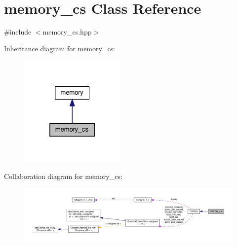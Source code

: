 \hypertarget{classmemory__cs}{}\section{memory\+\_\+cs Class Reference}
\label{classmemory__cs}


{\ttfamily \#include $<$memory\+\_\+cs.\+hpp$>$}



Inheritance diagram for memory\+\_\+cs\+:
\nopagebreak
\begin{figure}[H]
\begin{center}
\leavevmode
\includegraphics[width=148pt]{dd/d80/classmemory__cs__inherit__graph}
\end{center}
\end{figure}


Collaboration diagram for memory\+\_\+cs\+:
\nopagebreak
\begin{figure}[H]
\begin{center}
\leavevmode
\includegraphics[width=350pt]{df/d6c/classmemory__cs__coll__graph}
\end{center}
\end{figure}
